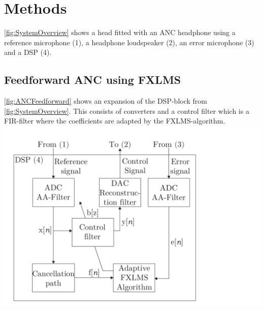 \section{Methods}
\autoref{fig:SystemOverview} shows a head fitted with an ANC headphone using a reference microphone (1), a headphone loudspeaker (2), an error microphone (3) and a DSP (4).





\subsection{Feedforward ANC using FXLMS}
\autoref{fig:ANCFeedforward} shows an expansion of the DSP-block from \autoref{fig:SystemOverview}. This consists of converters and a control filter which is a FIR-filter where the coefficients are adapted by the FXLMS-algorithm. 
{
	\includegraphics[width=1\columnwidth]{figures/ArticleIllustrations/ANCFeedForward}
	\label{fig:ANCFeedforward}
}



